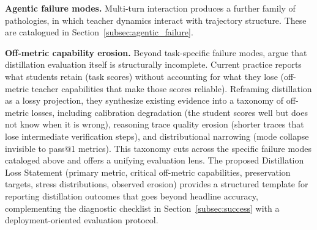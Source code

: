 \documentclass{article} %
\begin{document}
\textbf{Agentic failure modes.} Multi-turn interaction produces a further family of pathologies, in which teacher dynamics interact with trajectory structure. These are catalogued in Section~\ref{subsec:agentic_failure}.

\textbf{Off-metric capability erosion.} Beyond task-specific failure modes, \citet{2604.25110} argue that distillation evaluation itself is structurally incomplete. Current practice reports what students retain (task scores) without accounting for what they lose (off-metric teacher capabilities that make those scores reliable). Reframing distillation as a lossy projection, they synthesize existing evidence into a taxonomy of off-metric losses, including calibration degradation (the student scores well but does not know when it is wrong), reasoning trace quality erosion (shorter traces that lose intermediate verification steps), and distributional narrowing (mode collapse invisible to pass@1 metrics). This taxonomy cuts across the specific failure modes cataloged above and offers a unifying evaluation lens. The proposed Distillation Loss Statement (primary metric, critical off-metric capabilities, preservation targets, stress distributions, observed erosion) provides a structured template for reporting distillation outcomes that goes beyond headline accuracy, complementing the diagnostic checklist in Section~\ref{subsec:success} with a deployment-oriented evaluation protocol.
\end{document}
